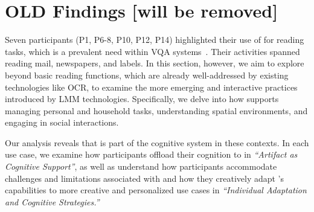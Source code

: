 






\section{OLD Findings [will be removed]}
\label{sec:findings}


Seven participants (P1, P6-8, P10, P12, P14) highlighted their use of \bma{} for reading tasks, which is a prevalent need within VQA systems~\cite{avila2016remote,lee2020emerging,BME_100ways}. Their activities spanned reading mail, newspapers, and labels. 
% 
In this section, however, we aim to explore beyond basic reading functions, which are already well-addressed by existing technologies like OCR, to examine the more emerging and interactive practices introduced by LMM technologies. Specifically, we delve into how \bma{} supports managing personal and household tasks, understanding spatial environments, and engaging in social interactions. 

Our analysis reveals that \bma{} is part of the cognitive system in these contexts. In each use case, we examine how participants offload their cognition to \bma{} in \textit{``Artifact as Cognitive Support''}, as well as understand how participants accommodate challenges and limitations associated with \bma{} and how they creatively adapt \bma's capabilities to more creative and personalized use cases in \textit{``Individual Adaptation and Cognitive Strategies.''}




